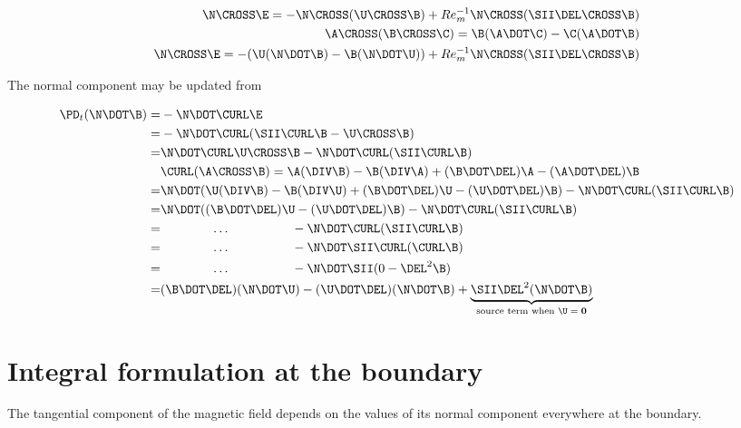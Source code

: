 \documentclass[11pt]{article}
\begin{document}
\begin{equation}\begin{aligned}
  \N \CROSS \E = -\N \CROSS (\U \CROSS \B) + Re_m^{-1} \N \CROSS (\SII \DEL \CROSS \B) \\
  \A \CROSS (\B \CROSS \C) = \B (\A \DOT \C) - \C (\A \DOT \B) \\
  \N \CROSS \E = -(\U (\N \DOT \B) - \B (\N \DOT \U)) + Re_m^{-1} \N \CROSS (\SII \DEL \CROSS \B) \\
\end{aligned}\end{equation}

The normal component may be updated from

\begin{equation}\begin{aligned}
  \PD_t (\N \DOT \B) =& - \N \DOT \CURL \E \\
   =& - \N \DOT \CURL (\SII \CURL \B - \U \CROSS \B) \\
   =& \N \DOT \CURL \U \CROSS \B - \N \DOT \CURL (\SII \CURL \B) \\
  & \CURL (\A \CROSS \B) = \A (\DIV \B) - \B (\DIV \A) + (\B \DOT \DEL)\A - (\A \DOT \DEL)\B \\
   =& \N \DOT (\U (\DIV \B) - \B (\DIV \U) + (\B \DOT \DEL)\U - (\U \DOT \DEL)\B) - \N \DOT \CURL (\SII \CURL \B) \\
   =& \N \DOT ((\B \DOT \DEL)\U - (\U \DOT \DEL)\B) - \N \DOT \CURL (\SII \CURL \B) \\
   =& \qquad \qquad \hdots \qquad \qquad \quad  - \N \DOT \CURL (\SII \CURL \B) \\
   =& \qquad \qquad \hdots \qquad \qquad \quad  - \N \DOT \SII \CURL (\CURL \B) \\
   =& \qquad \qquad \hdots \qquad \qquad \quad  - \N \DOT \SII (0 - \DEL^2 \B) \\
   =& (\B \DOT \DEL)(\N \DOT \U) - (\U \DOT \DEL)(\N \DOT \B) + \underbrace{\SII \DEL^2 (\N \DOT \B)}_{\text{source term when $\U=\mathbf{0}$}} \\
\end{aligned}\end{equation}

\section{Integral formulation at the boundary}
The tangential component of the magnetic field depends on the values of its normal component everywhere at the boundary.
\end{document}
